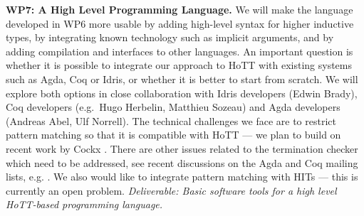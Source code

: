 \documentclass[a4paper,11pt]{article}
\newcommand{\eg}{{e.g.}\ }
\begin{document}
{\bf WP7: A High Level Programming Language.} We will make the
language developed in WP6 more usable by adding high-level syntax for
higher inductive types, by integrating known technology such as
implicit arguments, and by adding compilation and interfaces to other
languages. An important question is whether it is possible to
integrate our approach to HoTT with existing systems such as Agda, Coq
or Idris, or whether it is better to start from scratch.  We will
explore both options in close collaboration with Idris developers
(Edwin Brady), Coq developers (\eg Hugo Herbelin, Matthieu Sozeau) and
Agda developers (Andreas Abel, Ulf Norrell). The technical challenges
we face are to restrict pattern matching so that it is compatible with
HoTT --- we plan to build on recent work by Cockx
\cite{cockx-without-k}. There are other issues related to the
termination checker which need to be addressed, see recent discussions
on the Agda and Coq mailing lists, e.g. \cite{agda-issue}.  We also
would like to integrate pattern matching with HITs --- this is
currently an open problem.  {\em Deliverable: Basic software tools for
  a high level HoTT-based programming language. 
}





\end{document}
